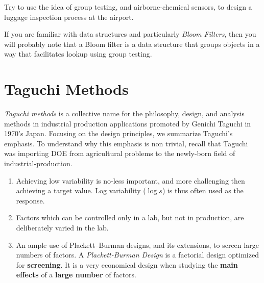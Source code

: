 \begin{think}
	Try to use the idea of group testing, and airborne-chemical sensors, to design a luggage inspection process at the airport. 
\end{think}


\begin{extra}
If you are familiar with data structures and particularly \emph{Bloom Filters}, then you will probably note that a Bloom filter is a data structure that groups objects in a way that facilitates lookup using group testing. 
\end{extra}











\section{Taguchi Methods}

\emph{Taguchi methods} is a collective name for the philosophy, design, and analysis methods in industrial production applications promoted by Genichi Taguchi in 1970's Japan.
Focusing on the design principles, we summarize Taguchi's emphasis. 
To understand why this emphasis is non trivial, recall that Taguchi was importing DOE from agricultural problems to the newly-born field of industrial-production.

\begin{enumerate}
	
	\item Achieving low variability is no-less important, and more challenging then achieving a target value. 
	Log variability ($\log s$) is thus often used as the response.
	
	\item Factors which can be controlled only in a lab, but not in production, are deliberately varied in the lab. 
	
	\item An ample use of Plackett–Burman designs, and its extensions, to screen large numbers of factors. 
	A \emph{Plackett-Burman Design} is a factorial design optimized for \textbf{screening}. 
	It is a very economical design when studying the \textbf{main effects} of a \textbf{large number} of factors. 
	
	
\end{enumerate}






